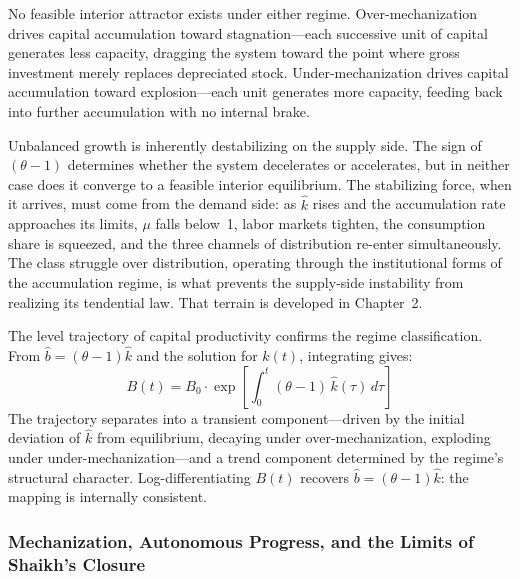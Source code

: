 \documentclass[11pt,a4paper]{article}
\begin{document}
No feasible interior attractor exists under either regime. Over-mechanization drives capital accumulation toward stagnation---each successive unit of capital generates less capacity, dragging the system toward the point where gross investment merely replaces depreciated stock. Under-mechanization drives capital accumulation toward explosion---each unit generates more capacity, feeding back into further accumulation with no internal brake.

Unbalanced growth is inherently destabilizing on the supply side. The sign of $(\theta - 1)$ determines whether the system decelerates or accelerates, but in neither case does it converge to a feasible interior equilibrium. The stabilizing force, when it arrives, must come from the demand side: as $\hat{k}$ rises and the accumulation rate approaches its limits, $\mu$ falls below~1, labor markets tighten, the consumption share is squeezed, and the three channels of distribution re-enter simultaneously. The class struggle over distribution, operating through the institutional forms of the accumulation regime, is what prevents the supply-side instability from realizing its tendential law. That terrain is developed in Chapter~2.

The level trajectory of capital productivity confirms the regime classification. From $\hat{b} = (\theta - 1)\hat{k}$ and the solution for $\hat{k}(t)$, integrating gives:
%
\begin{equation}\label{eq:B_trajectory}
	B(t) = B_0 \cdot \exp\left[\int_0^t (\theta - 1)\,\hat{k}(\tau)\,d\tau\right]
\end{equation}
%
The trajectory separates into a transient component---driven by the initial deviation of $\hat{k}$ from equilibrium, decaying under over-mechanization, exploding under under-mechanization---and a trend component determined by the regime's structural character. Log-differentiating $B(t)$ recovers $\hat{b} = (\theta - 1)\hat{k}$: the mapping is internally consistent.



\subsubsection{Mechanization, Autonomous Progress, and the Limits of Shaikh's Closure}
\label{sec:extended_closure}
\end{document}
